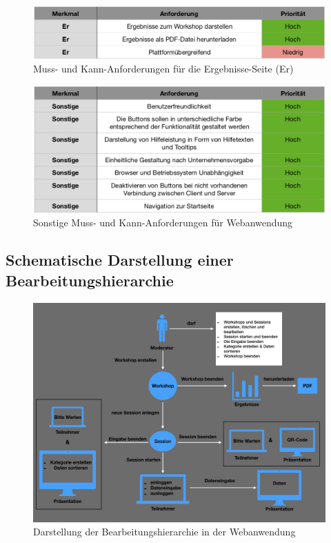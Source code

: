 \begin{figure}[H]
  \centering  
  \includegraphics[scale=0.6]{img/Ergebnisse-Seite.png}
  \caption{Muss- und Kann-Anforderungen für die Ergebnisse-Seite (Er)}
  \label{fig:ergebnisse-seite}
\end{figure}

\begin{figure}[H]
  \centering  
  \includegraphics[scale=0.6]{img/Sonstige.png}
  \caption{Sonstige Muss- und Kann-Anforderungen für Webanwendung} 	
  \label{fig:sonstige}
\end{figure}

\subsection{Schematische Darstellung einer Bearbeitungshierarchie}
\begin{figure}[H]
  \centering  
  \includegraphics[scale=0.4]{img/Anforderung.jpeg}
  \caption{Darstellung der Bearbeitungshierarchie in der Webanwendung}
  \label{fig:anforderung}
\end{figure}











